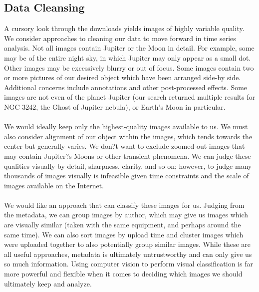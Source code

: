 \documentclass[]{article}
\begin{document}
\subsection*{Data Cleansing}
A cursory look through the downloads yields images of highly variable quality. We consider approaches to cleaning our data to move forward in time series analysis. Not all images contain Jupiter or the Moon in detail. For example, some may be of the entire night sky, in which Jupiter may only appear as a small dot. Other images may be excessively blurry or out of focus. Some images contain two or more pictures of our desired object which have been arranged side-by side. Additional concerns include annotations and other post-processed effects. Some images are not even of the planet Jupiter (our search returned multiple results for NGC 3242, the Ghost of Jupiter nebula), or Earth's Moon in particular.
\\\\
We would ideally keep only the highest-quality images available to us. We must also consider alignment of our object within the images, which tends towards the center but generally varies. We don?t want to exclude zoomed-out images that may contain Jupiter?s Moons or other transient phenomena. We can judge these qualities visually by detail, sharpness, clarity, and so on; however, to judge many thousands of images visually is infeasible given time constraints and the scale of images available on the Internet.
\\\\
We would like an approach that can classify these images for us. Judging from the metadata, we can group images by author, which may give us images which are visually similar (taken with the same equipment, and perhaps around the same time). We can also sort images by upload time and cluster images which were uploaded together to also potentially group similar images. While these are all useful approaches, metadata is ultimately untrustworthy and can only give us so much information. Using computer vision to perform visual classification is far more powerful and flexible when it comes to deciding which images we should ultimately keep and analyze.
\end{document}
